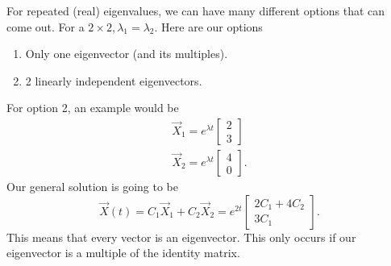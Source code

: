 For repeated (real) eigenvalues, we can have many different options that can come out. For a $2\times 2, \lambda_1=\lambda_2$. Here are our options 
\begin{enumerate}
  \item Only one eigenvector (and its multiples).
  \item 2 linearly independent eigenvectors.
\end{enumerate}
For option 2, an example would be 
\begin{align*}
  \vec{X}_1=e^{\lambda t}\begin{bmatrix} 2\\3 \end{bmatrix} \\
  \vec{X}_2=e^{\lambda t}\begin{bmatrix} 4\\0 \end{bmatrix} 
.\end{align*}
Our general solution is going to be \[
  \vec{X}(t)=C_1\vec{X}_1+C_2\vec{X}_2=e^{2t}\begin{bmatrix} 2C_1+4C_2\\3C_1 \end{bmatrix} 
.\] This means that every vector is an eigenvector. This only occurs if our eigenvector is a multiple of the identity matrix.
